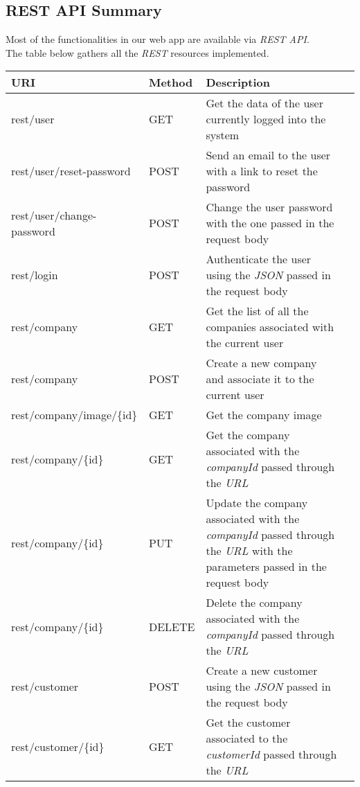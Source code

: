 \newpage
\subsection{REST API Summary}

Most of the functionalities in our web app are available via \textit{REST API}.  \\
The table below gathers all the \textit{REST} resources implemented.

\begin{longtable}{|p{}|p{} |p{}|p{}|} 
\hline
\textbf{URI} & \textbf{Method} & \textbf{Description} \\\hline
rest/user & GET & Get the data of the user currently logged into the system \\\hline
rest/user/reset-password & POST & Send an email to the user with a link to reset the password \\\hline
rest/user/change-password & POST & Change the user password with the one passed in the request body \\\hline
rest/login & POST & Authenticate the user using the \textit{JSON} passed in the request body\\\hline
rest/company & GET & Get the list of all the companies associated with the current user \\\hline
rest/company & POST & Create a new company and associate it to the current user \\\hline
rest/company/image/\{id\} & GET & Get the company image \\\hline
rest/company/\{id\} & GET & Get the company associated with the \textit{companyId} passed through the \textit{URL} \\\hline
rest/company/\{id\} & PUT & Update the company associated with the \textit{companyId} passed through the \textit{URL} with the parameters passed in the request body \\\hline
rest/company/\{id\} & DELETE & Delete the company associated with the \textit{companyId} passed through the \textit{URL} \\\hline
rest/customer & POST & Create a new customer using the \textit{JSON} passed in the request body \\\hline
rest/customer/\{id\} & GET & Get the customer associated to the \textit{customerId} passed through the \textit{URL} \\\hline

\end{longtable}
